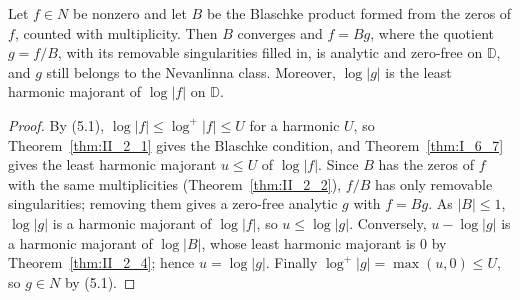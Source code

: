 \begin{lemma}
  \label{lem:II_5_2}
  \leanok
  \mainline
  Let $f\in N$ be nonzero and let $B$ be the Blaschke product formed from the
  zeros of $f$, counted with multiplicity. Then $B$ converges and $f=Bg$, where
  the quotient $g=f/B$, with its removable singularities filled in, is analytic
  and zero-free on $\mathbb{D}$, and $g$ still belongs to the Nevanlinna class.
  Moreover, $\log|g|$ is the least harmonic majorant of $\log|f|$ on
  $\mathbb{D}$.
  \begin{proof}
    \notready
    By (5.1), $\log|f|\le\log^+|f|\le U$ for a harmonic $U$, so
    Theorem~\ref{thm:II_2_1} gives the Blaschke condition, and
    Theorem~\ref{thm:I_6_7} gives the least harmonic majorant $u\le U$ of
    $\log|f|$. Since $B$ has the zeros of $f$ with the same multiplicities
    (Theorem~\ref{thm:II_2_2}), $f/B$ has only removable singularities;
    removing them gives a zero-free analytic $g$ with $f=Bg$. As $|B|\le1$,
    $\log|g|$ is a harmonic majorant of $\log|f|$, so $u\le\log|g|$.
    Conversely, $u-\log|g|$ is a harmonic majorant of $\log|B|$, whose least
    harmonic majorant is $0$ by Theorem~\ref{thm:II_2_4}; hence
    $u=\log|g|$. Finally $\log^+|g|=\max(u,0)\le U$, so $g\in N$ by (5.1).
  \end{proof}
\end{lemma}

